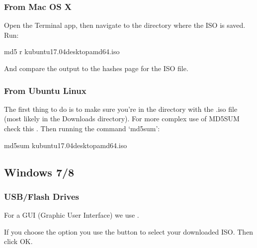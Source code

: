 \documentclass[letterpaper,10pt,english]{sphinxmanual}
\begin{document}
\subsubsection{From Mac OS X}
\label{\detokenize{docs/installation:from-mac-os-x}}
Open the Terminal app, then navigate to the directory where the ISO is saved.
Run:

\begin{sphinxVerbatim}[commandchars=\\\{\}]
md5 \PYGZhy{}r kubuntu\PYGZhy{}17.04\PYGZhy{}desktop\PYGZhy{}amd64.iso
\end{sphinxVerbatim}

And compare the output to the hashes page for the ISO file.


\subsubsection{From Ubuntu Linux}
\label{\detokenize{docs/installation:from-ubuntu-linux}}
The first thing to do is to make sure you're in the directory with the .iso file (most likely in the Downloads directory). For more complex use of MD5SUM check this . Then running the command `md5sum':

\begin{sphinxVerbatim}[commandchars=\\\{\}]
md5sum kubuntu\PYGZhy{}17.04\PYGZhy{}desktop\PYGZhy{}amd64.iso
\end{sphinxVerbatim}


\subsection{Windows 7/8}
\label{\detokenize{docs/installation:windows-7-8}}

\subsubsection{USB/Flash Drives}
\label{\detokenize{docs/installation:usb-drives-link}}\label{\detokenize{docs/installation:usb-flash-drives}}
For a GUI (Graphic User Interface) we use .

If you choose the  option you use the  button to select your downloaded ISO. Then click OK.

\end{document}
